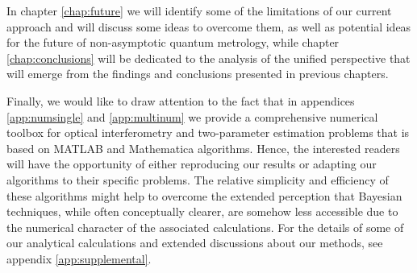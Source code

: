 In chapter \ref{chap:future} we will identify some of the limitations of our current approach and will discuss some ideas to overcome them, as well as potential ideas for the future of non-asymptotic quantum metrology, while chapter \ref{chap:conclusions} will be dedicated to the analysis of the unified perspective that will emerge from the findings and conclusions presented in previous chapters. 

Finally, we would like to draw attention to the fact that in appendices \ref{app:numsingle} and \ref{app:multinum} we provide a comprehensive numerical toolbox for optical interferometry and two-parameter estimation problems that is based on MATLAB and Mathematica algorithms. Hence, the interested readers will have the opportunity of either reproducing our results or adapting our algorithms to their specific problems. The relative simplicity and efficiency of these algorithms might help to overcome the extended perception that Bayesian techniques, while often conceptually clearer, are somehow less accessible due to the numerical character of the associated calculations. For the details of some of our analytical calculations and extended discussions about our methods, see appendix \ref{app:supplemental}.